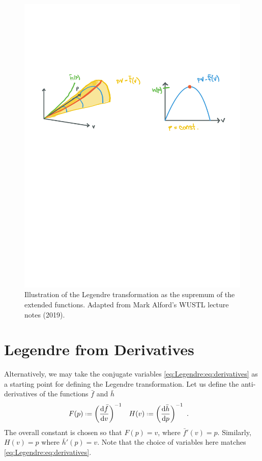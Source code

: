 \begin{figure}[tb]
    \centering
    \includegraphics[width=\linewidth]{figures/Legendre3D.pdf}
    \caption{Illustration of the Legendre transformation as the supremum of the extended functions. Adapted from Mark Alford's {WUSTL} lecture notes (2019).}
    \label{fig:Legendre:3D}
\end{figure}

\section{Legendre from Derivatives}

Alternatively, we may take the conjugate variables \eqref{eq:Legendre:eq:derivatives} as a starting point for defining the Legendre transformation. Let us define the anti-derivatives of the functions $\bar f$ and $\bar h$
\begin{align}
    F(p) &\defeq 
    \left(\frac{\D{\bar f}}{\D{v}}\right)^{-1}
    &
    H(v) &\defeq 
    \left(\frac{\D{\bar h}}{\D{p}}\right)^{-1}
    \ .
\end{align}
The overall constant is chosen so that $F(p) = v$, where $\bar f'(v)= p$. Similarly, $H(v)=p$ where $\bar h'(p) = v$. Note that the choice of variables here matches \eqref{eq:Legendre:eq:derivatives}. 

